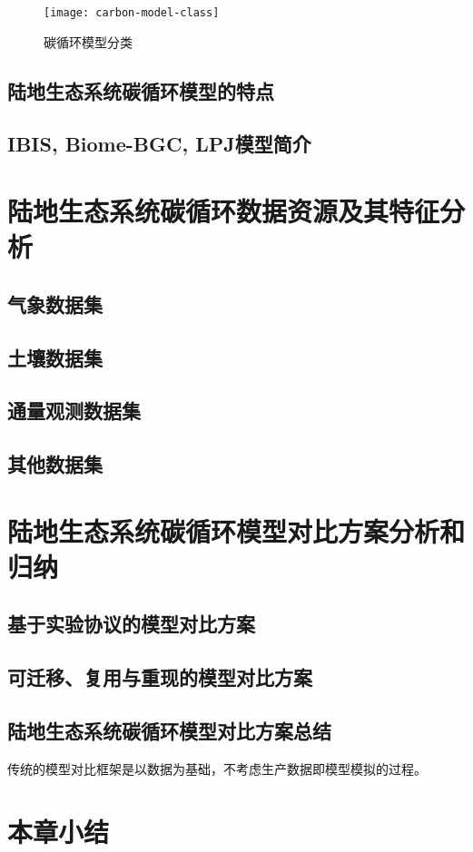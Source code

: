 \begin{figure}
    \centering
    \texttt{[image: carbon-model-class]}
    \caption{碳循环模型分类}
    \label{fig:carbon-model-class}
\end{figure}

\subsection{陆地生态系统碳循环模型的特点}

\subsection{IBIS, Biome-BGC, LPJ模型简介}

\section{陆地生态系统碳循环数据资源及其特征分析}
\subsection{气象数据集}
\subsection{土壤数据集}
\subsection{通量观测数据集}
\subsection{其他数据集}

\section{陆地生态系统碳循环模型对比方案分析和归纳}
\subsection{基于实验协议的模型对比方案}

\subsection{可迁移、复用与重现的模型对比方案}

\subsection{陆地生态系统碳循环模型对比方案总结}
传统的模型对比框架是以数据为基础，不考虑生产数据即模型模拟的过程。

\section{本章小结}